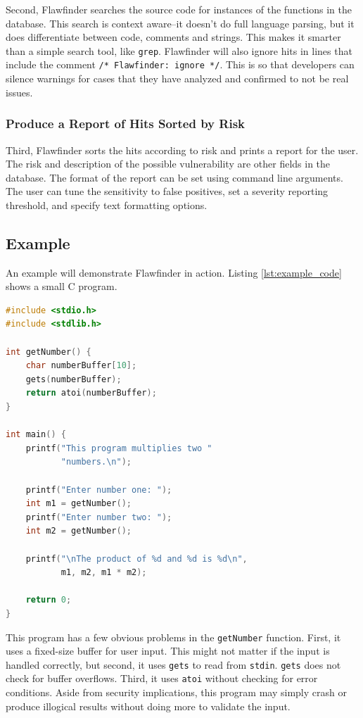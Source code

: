 \documentclass[journal]{IEEEtran}
\def\tt#1{\mbox{\texttt{#1}}}
\begin{document}
Second, Flawfinder searches the source code for instances of the functions in the database. This
search is context aware--it doesn't do full language parsing, but it does differentiate between
code, comments and strings. This makes it smarter than a simple search tool, like \tt{grep}.
Flawfinder will also ignore hits in lines that include the comment \tt{/* Flawfinder: ignore */}.
This is so that developers can silence warnings for cases that they have analyzed and confirmed to
not be real issues.

\subsubsection{Produce a Report of Hits Sorted by Risk}

Third, Flawfinder sorts the hits according to risk and prints a report for the user. The risk and
description of the possible vulnerability are other fields in the database. The format of the report
can be set using command line arguments. The user can tune the sensitivity to false positives, set
a severity reporting threshold, and specify text formatting options.

\subsection{Example}

An example will demonstrate Flawfinder in action. Listing \ref{lst:example_code} shows a small C
program.

\begin{lstlisting}[language=c, caption=C Example Program, label=lst:example_code]
#include <stdio.h>
#include <stdlib.h>

int getNumber() {
    char numberBuffer[10];
    gets(numberBuffer);
    return atoi(numberBuffer);
}

int main() {
    printf("This program multiplies two "
           "numbers.\n");

    printf("Enter number one: ");
    int m1 = getNumber();
    printf("Enter number two: ");
    int m2 = getNumber();

    printf("\nThe product of %d and %d is %d\n",
           m1, m2, m1 * m2);

    return 0;
}
\end{lstlisting}

This program has a few obvious problems in the \tt{getNumber} function. First, it uses a fixed-size
buffer for user input. This might not matter if the input is handled correctly, but second, it uses
\tt{gets} to read from \tt{stdin}. \tt{gets} does not check for buffer overflows. Third, it uses
\tt{atoi} without checking for error conditions. Aside from security implications, this program may
simply crash or produce illogical results without doing more to validate the input.
\end{document}
